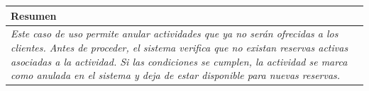 \begin{table}[H]
    \begin{tabular}{llllllll}
    \hline
    \multicolumn{8}{|l|}{\cellcolor[HTML]{F2F2F2}Resumen}                                                                                                                                                                                                                                                                                                                                                                                             \\ \hline
    \multicolumn{8}{|p{15cm}|}{{\color[HTML]{808080} \textit{Este caso de uso permite anular actividades que ya no serán ofrecidas a los clientes. Antes de proceder, el sistema verifica que no existan reservas activas asociadas a la actividad. Si las condiciones se cumplen, la actividad se marca como anulada en el sistema y deja de estar disponible para nuevas reservas.}}} \\ \hline
    \end{tabular}
\end{table}

